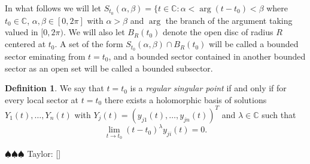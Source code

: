 \documentclass[12pt]{book}
\newcommand{\taylor}[1]{{\color{blue} \sf $\spadesuit\spadesuit\spadesuit$ Taylor: [#1]}}
\numberwithin{equation}{section}
\theoremstyle{definition}
\newtheorem{definition}[theorem]{Definition}
\theoremstyle{remark}
\newcommand{\CC}{\mathbb{C}}
\newcommand{\hol}{\operatorname{Hol}}
\begin{document}
In what follows we will let $S_{t_0}(\alpha,\beta) = \lbrace t \in \CC : \alpha<\arg(t-t_0) <\beta$ where $t_0 \in \CC$, $\alpha,\beta \in [0,2\pi]$ with $\alpha>\beta$ and $\arg$ the branch of the argument taking valued in $[0,2\pi)$.
We will also let $B_R(t_0)$ denote the open disc of radius $R$ centered at $t_0$.
A set of the form $S_{t_0}(\alpha,\beta) \cap B_R(t_0)$ will be called a bounded sector eminating from $t=t_0$, and a bounded sector contained in another bounded sector as an open set will be called a bounded subsector.
\iffalse 
\begin{definition}
Let $S = S_{t_0}(\alpha,\beta) \cap B_R(t_0)$ be a sector of bounded radius eminating from $t_0$ (which is by definition open and doesn't contain $t_0$).
We say that a matrix $\Phi(t) \in M_{m,n}(\hol(S))$ is \emph{regular singular at $t_0$} if and only if for all subsectors $S' \subset S$ of strictly smaller radius and angle there exists some integer $m$ such that 
 $$ \lim_{t \to t_0, t\in S'} \Vert \Phi(t) \Vert  = O( \vert t-t_0 \vert^{-m}).$$
 \end{definition}
\fi

\begin{definition}
	We say that $t=t_0$ is a \emph{regular singular point} if and only if  for every local sector at $t=t_0$ there exists a holomorphic basis of solutions $Y_1(t),\ldots,Y_n(t)$ with $Y_j(t)=(y_{j1}(t),\ldots,y_{jn}(t))^T$ and $\lambda \in \CC$ such that 
	$$ \lim_{t\to t_0} (t-t_0)^{\lambda} y_{ji}(t) =0. $$
	
	\taylor{}
\end{definition}
\end{document}
